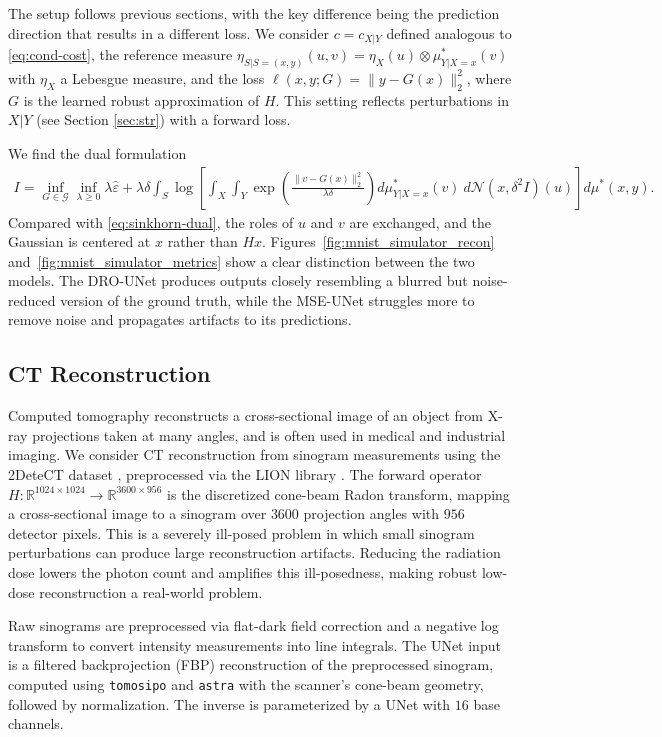 \documentclass{article}
\newcommand{\R}{\mathbb{R}} %
\theoremstyle{definition}
\theoremstyle{remarksty}
\begin{document}
The setup follows previous sections, with the key difference being the prediction direction that results in a different loss. We consider $c=c_{X|Y}$ defined analogous to \eqref{eq:cond-cost}, the reference measure $\eta_{S|S=(x,y)}(u,v)=\eta_X(u)\otimes\mu_{Y|X=x}^*(v)$ with $\eta_X$ a Lebesgue measure, and the loss $\ell(x,y;G)=\|y-G(x)\|_2^2$, where $G$ is the learned robust approximation of $H$. This setting reflects perturbations in $X|Y$ (see Section \ref{sec:str}) with a forward loss.

We find the dual formulation 
\begin{align*}
    I = \inf_{G\in \mathcal{G}} \inf_{\lambda \geq 0} \lambda \hat \varepsilon +  \lambda\delta\int_{S} \log \left[ \int_X\int_Y \exp\left(\frac{\|v-G(x)\|^2_2}{\lambda \delta}\right)d\mu_{Y|X=x}^*(v)\ d\mathcal{N}(x, \delta^2I)(u)\right] d\mu^*(x,y).
\end{align*}
Compared with \eqref{eq:sinkhorn-dual}, the roles of $u$ and $v$ are exchanged, and the Gaussian is centered at $x$ rather than $Hx$. Figures~\ref{fig:mnist_simulator_recon} and~\ref{fig:mnist_simulator_metrics} show a clear distinction between the two models. The DRO-UNet produces outputs closely resembling a blurred but noise-reduced version of the ground truth, while the MSE-UNet struggles more to remove noise and propagates artifacts to its predictions.

\subsection{CT Reconstruction}
Computed tomography reconstructs a cross-sectional image of an object from X-ray projections taken at many angles, and is often used in medical and industrial imaging. We consider CT reconstruction from sinogram measurements using the 2DeteCT dataset \cite{kiss_2detect_2023}, preprocessed via the LION library \cite{biguri_lion_2026}. The forward operator $H:\R^{1024\times1024}\to\R^{3600\times956}$ is the discretized cone-beam
Radon transform, mapping a cross-sectional image to a sinogram over $3600$ projection angles with $956$ detector pixels. This is a severely ill-posed problem in which small sinogram perturbations can produce large reconstruction artifacts. Reducing the radiation dose lowers the photon count and amplifies this ill-posedness, making robust low-dose reconstruction a real-world problem.

Raw sinograms are preprocessed via flat-dark field correction and a negative log transform to convert intensity measurements into line integrals. The UNet input is a filtered backprojection (FBP) reconstruction of the preprocessed sinogram, computed using \verb|tomosipo| \cite{hendriksen_tomosipo_2021} and \verb|astra| \cite{van_aarle_astra_2015} with the scanner's cone-beam geometry, followed by normalization. The inverse is parameterized by a UNet with $16$ base channels. 
\end{document}
